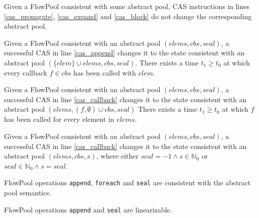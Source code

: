 \documentclass[runningheads,a4paper]{llncs}
\begin{document}
%

\begin{lemma}
Given a FlowPool consistent with some abstract
pool, CAS instructions in lines \ref{cas_propagate}, \ref{cas_expand} and
\ref{cas_block} do not change the corresponding abstract pool.
\end{lemma}

\begin{lemma}
Given a FlowPool consistent with an abstract pool $(elems, cbs,
seal)$, a successful CAS in line \ref{cas_append}
changes it to the state consistent with an abstract pool
$(\{elem\} \cup elems, cbs, seal)$.
There exists a time $t_1 \geq t_0$ at which every callback $f \in
cbs$ has been called with $elem$.
\end{lemma}

\begin{lemma}
Given a FlowPool consistent with an abstract pool $(elems, cbs, seal)$, 
a successful CAS in line \ref{cas_callback} changes it 
to the state consistent with an abstract pool $(elems, (f, \emptyset)
\cup cbs, seal)$
There exists a time $t_1 \geq t_0$ at which $f$ has been called for
every element in $elems$.
\end{lemma}

\begin{lemma}
Given a FlowPool consistent with an abstract pool $(elems, cbs, seal)$, 
a successful CAS in line \ref{cas_callback} changes it to the state 
consistent with an abstract pool $(elems, cbs, s)$, where either $seal
= -1 \wedge s \in \mathbb{N}_0$ or $seal \in \mathbb{N}_0 \wedge s = seal$.
\end{lemma}

\begin{theorem}[Safety]
FlowPool operations \verb=append=, \verb=foreach=
and \verb=seal= are consistent with the abstract pool semantics.
\end{theorem}


\begin{theorem}
FlowPool operations \verb=append= and \verb=seal= are linearizable.
\end{theorem}
\end{document}
